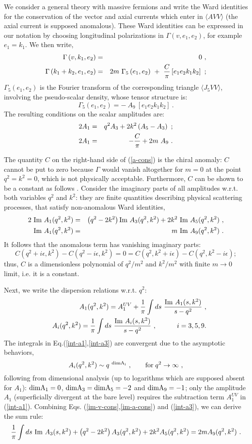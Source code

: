 \documentclass[11pt]{article}
\newcommand{\beq}{\begin{equation}}
\newcommand{\eeq}{\end{equation}}
\newcommand{\bea}{\begin{eqnarray}}
\newcommand{\eea}{\end{eqnarray}}
\def\eps{\epsilon}
\def\G{\Gamma}
\def\di{\rm dim}
\def\Im{\hbox{\rm Im\ }}
\def\nl{\nonumber\\}
\def\bra{\langle}
\def\ket{\rangle}
\begin{document}
We consider a general theory with massive fermions and 
write the Ward identities for the conservation of the vector and
axial currents which enter in $\bra AVV \ket$ 
(the axial current is supposed anomalous).
These Ward identities can be expressed in our notation by choosing
longitudinal polarizations in $\G\left(v,e_1,e_2 \right)$, for example
$e_1= k_1$. We then write,
\bea
\G\left(v,k_1,e_2 \right) &=& 0 \ ,\nl
\G\left(k_1+k_2,e_1,e_2 \right) &=& 
2m \ \G_5\left(e_1,e_2 \right)\ +\ 
{C \over \pi}\left[e_1 e_2 k_1 k_2 \right]\ ;
\label{chiwi}
\eea
$\G_5\left(e_1,e_2 \right)$ is the Fourier transform of the
corresponding triangle $\bra J_5 V V \ket$, involving
the pseudo-scalar density, whose tensor structure is:
\beq
\G_5\left(e_1,e_2 \right) = -\ A_9\ \left[e_1 e_2 k_1 k_2 \right]\ .
\label{G5}
\eeq
The resulting conditions on the scalar amplitudes are: 
\bea 
2 A_1 &=& q^2 A_3 + 2k^2 \left(A_5-A_3 \right)\ ;\label{v-cons}\\ 
2 A_1 &=&  -{ C\over \pi} + 2 m\ A_9\ . 
\label{a-cons} 
\eea 

The quantity $C$ on the right-hand side of (\ref{a-cons}) is the  
chiral anomaly: $C$ cannot be put to zero 
because $\G$ would vanish altogether for $m=0$ at the point $q^2=k^2=0$, 
which is not physically acceptable.
Furthermore, $C$ can be shown to be a constant as follows \cite{fsby}.
Consider the imaginary parts of all amplitudes w.r.t. both variables  
$q^2$ and $k^2$: they are finite quantities  
describing physical scattering processes, that satisfy 
non-anomalous Ward identities,
\bea 
2 \ \Im A_1(q^2,k^2) &=& \left( q^2 -2 k^2 \right) \Im A_3(q^2,k^2)+
2 k^2\ \Im A_5 (q^2,k^2)\ , 
\label{im-v-cons} \\ 
\Im A_1(q^2,k^2) &=& m\ \Im A_9(q^2,k^2) \ .
\label{im-a-cons}
\eea 
It follows that the anomalous term has vanishing imaginary parts:
\beq
C(q^2+i\eps,k^2)-C(q^2-i\eps,k^2) =0=
C(q^2,k^2+i\eps)-C(q^2,k^2-i\eps);
\eeq
thus, $C$ is a dimensionless polynomial of $q^2/m^2$ and $k^2/m^2$ with
finite $m\to 0$ limit, i.e. it is a constant.
 
Next, we write the dispersion relations w.r.t. $q^2$: 
\bea\label{int-a1} 
&&A_1(q^2,k^2)=A^{UV}_1 +{1\over \pi }\int ds\  
{\Im A_1(s,k^2) \over s- q^2} \ , 
\\ 
\label{int-a3} 
&& A_i(q^2,k^2) = {1\over \pi }\int ds\  
{\Im A_i(s,k^2) \over s- q^2} \ , \quad\qquad i=3,5,9.
\eea 
The integrals in Eq.(\ref{int-a1},\ref{int-a3}) 
are convergent due to the asymptotic behaviors,
\beq 
A_i(q^2,k^2)\sim q^{\ \di A_i }\ , \qquad {\rm for}\; q^2\to \infty \ ,
\eeq
following from dimensional analysis (up to logarithms which are supposed
absent for $A_1$):
$\di A_1 = 0$, $\di A_3 =\di A_5 =-2$ and $\di A_9 =-1$; 
only the amplitude $A_1$ (superficially divergent at the bare level)
requires the subtraction term $A_1^{UV}$ in (\ref{int-a1}). 
Combining Eqs. (\ref{im-v-cons},\ref{im-a-cons}) and  
(\ref{int-a3}), we can derive the sum rule: 
\beq\label{sumrule} 
{1\over \pi }\int ds\ {\Im A_3(s,k^2) } + 
\left( q^2-2 k^2 \right) A_3(q^2,k^2) + 2 k^2 A_5(q^2,k^2) =
2 m A_9 (q^2,k^2) \ . 
\eeq 
\end{document}
